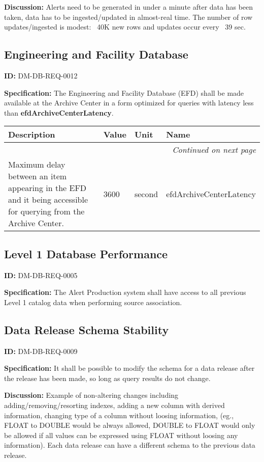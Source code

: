 \documentclass[DM,toc]{lsstdoc}
\makeatletter
\newcommand{\paramname}[1]{\hspace{0pt}#1}
\newcommand{\unitname}[1]{\hspace{0pt}#1}
\newenvironment{parameters}[0]{%
\setlength\LTleft{0pt}
\setlength\LTright{\fill}
\begin{small}
\begin{longtable}[]{|p{0.49\textwidth}|l|p{0.6in}|p{1.70in}@{}|}

\hline \textbf{Description} & \textbf{Value} & \textbf{Unit} & \textbf{Name} \\ \hline
\endhead

\hline \multicolumn{4}{r}{\emph{Continued on next page}} \\
\endfoot

\hline\hline
\endlastfoot
}{%
\hline
\end{longtable}
\end{small}
}
\makeatother
\begin{document}
\textbf{Discussion:}
Alerts need to be generated in under a minute after data has been taken, data has to be ingested/updated in almost-real time. The number of row updates/ingested is modest: ~40K new rows and updates occur every ~39 sec.

\subsection{Engineering and Facility Database}

\label{DM-DB-REQ-0012}
\textbf{ID:} DM-DB-REQ-0012

\textbf{Specification:}
The Engineering and Facility Database (EFD) shall be made available at the Archive Center in a form optimized for queries with latency less than \textbf{efdArchiveCenterLatency}.

\begin{parameters}
Maximum delay between an item appearing in the EFD and it being accessible for querying from the Archive Center.
&
3600
&
\unitname{%
second
}
&
\paramname{%
efdArchiveCenterLatency
} \\\hline
\end{parameters}

\subsection{Level 1 Database Performance}

\label{DM-DB-REQ-0005}
\textbf{ID:} DM-DB-REQ-0005

\textbf{Specification:}
The Alert Production system shall have access to all previous Level 1 catalog data when performing source association.

\subsection{Data Release Schema Stability}

\label{DM-DB-REQ-0009}
\textbf{ID:} DM-DB-REQ-0009

\textbf{Specification:}
It shall be possible to modify the schema for a data release after the release has been made, so long as query results do not change.

\textbf{Discussion:}
Example of non-altering changes including adding/removing/resorting indexes, adding a new column with derived information, changing type of a column without loosing information, (eg., FLOAT to DOUBLE would be always allowed, DOUBLE to FLOAT would only be allowed if all values can be expressed using FLOAT without loosing any information). Each data release can have a different schema to the previous data release.
\end{document}
